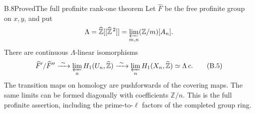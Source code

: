 \begin{statement}{B.8}{Proved}{The full profinite rank-one theorem}
Let \(\widehat F\) be the free profinite group on \(x,y\), and put
\[
 \Lambda=\widehat{\mathbb Z}[[\widehat{\mathbb Z}^{\,2}]]
 =\varprojlim_{m,n}(\mathbb Z/m)[A_n].
\]
There are continuous \(\Lambda\)-linear isomorphisms
\[
 \widehat F'/\widehat F''
 \xrightarrow{\ \sim\ }\varprojlim_n H_1(U_n,\widehat{\mathbb Z})
 \xrightarrow{\ \sim\ }\varprojlim_n H_1(X_n,\widehat{\mathbb Z})
 \simeq\Lambda\,c.                                          \tag{B.5}
\]
The transition maps on homology are pushforwards of the covering maps.
The same limits can be formed diagonally with coefficients
\(\mathbb Z/n\). This is the full profinite assertion, including
the prime-to-\(\ell\) factors of the completed group ring.
\end{statement}
